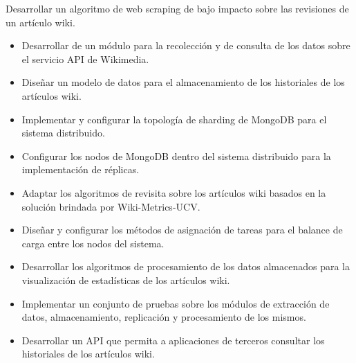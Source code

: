 Desarrollar un algoritmo de web scraping de bajo impacto sobre las revisiones
de un artículo wiki.

\begin{itemize}
\item Desarrollar de un módulo para la recolección y de consulta de los datos sobre el
servicio API de Wikimedia.

\item Diseñar un modelo de datos para el almacenamiento de los historiales de los
artículos wiki.

\item Implementar y configurar la topología de sharding de MongoDB para el sistema
distribuido.

\item Configurar los nodos de MongoDB dentro del sistema distribuido para la
implementación de réplicas.

\item Adaptar los algoritmos de revisita sobre los artículos wiki basados en la solución
brindada por Wiki-Metrics-UCV.

\item Diseñar y configurar los métodos de asignación de tareas para el balance de
carga entre los nodos del sistema.

\item Desarrollar los algoritmos de procesamiento de los datos almacenados para la
visualización de estadísticas de los artículos wiki.

\item Implementar un conjunto de pruebas sobre los módulos de extracción de datos,
almacenamiento, replicación y procesamiento de los mismos.

\item Desarrollar un API que permita a aplicaciones de terceros consultar los
historiales de los artículos wiki.

\end{itemize}